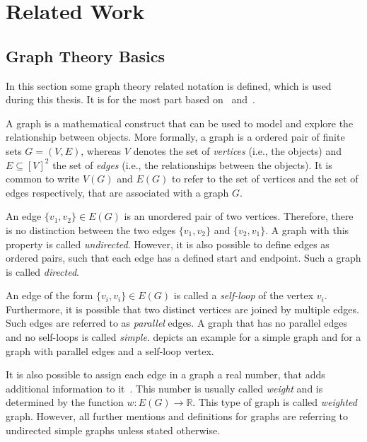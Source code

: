 \chapter{Related Work}
\label{cha:related-work}


\section{Graph Theory Basics}
\label{sec:graph-theory-basics}

In this section some graph theory related notation is defined, which is used during this thesis.
It is for the most part based on~\cite{Thulasiraman1992} and~\cite{Diestel2012}.

A graph is a mathematical construct that can be used to model and explore the relationship between objects.
More formally, a graph is a ordered pair of finite sets \( G = (V, E) \), whereas \( V \) denotes the set of \emph{vertices} (i.e., the objects) and \( E \subseteq {[V]}^{2} \) the set of \emph{edges} (i.e., the relationships between the objects).
It is common to write \( V(G) \) and \( E(G) \) to refer to the set of vertices and the set of edges respectively, that are associated with a graph \( G \).

An edge \( \{v_1, v_2\} \in E(G) \) is an unordered pair of two vertices.
Therefore, there is no distinction between the two edges \( \{v_1, v_2 \} \) and \( \{v_2, v_1\} \).
A graph with this property is called \emph{undirected}.
However, it is also possible to define edges as ordered pairs, such that each edge has a defined start and endpoint.
Such a graph is called \emph{directed}.

An edge of the form \( \{v_i, v_i\} \in E(G) \) is called a \emph{self-loop} of the vertex \( v_i \).
Furthermore, it is possible that two distinct vertices are joined by multiple edges.
Such edges are referred to as \emph{parallel} edges.
A graph that has no parallel edges and no self-loops is called \emph{simple}.
 depicts an example for a simple graph and for a graph with parallel edges and a self-loop vertex.

It is also possible to assign each edge in a graph a real number, that adds additional information to it~\cite{Cormen2009}.
This number is usually called \emph{weight} and is determined by the function \( w : E(G) \rightarrow \mathbb{R} \).
This type of graph is called \emph{weighted} graph.
However, all further mentions and definitions for graphs are referring to undirected simple graphs unless stated otherwise.

